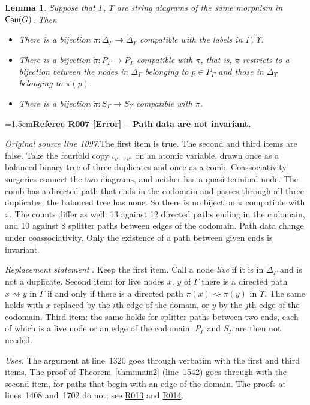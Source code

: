 \documentclass[12pt]{amsart}
\newcommand{\RefereeRemark}[4]{%
  \par\medskip\begingroup\normalfont\small\color{RefereePurple}%
  \emergencystretch=1.5em\noindent\textbf{Referee R#1 [#2] -- #3.}\par\nobreak\noindent #4\par
  \endgroup\medskip
}
\theoremstyle{plain}
\newtheorem{lem}[thm]{Lemma}
\theoremstyle{definition}
\theoremstyle{remark}
\numberwithin{equation}{section}
\theoremstyle{plain}
\newcommand{\0}{\emptyset}
\newcommand{\fun}{\longrightarrow}
\DeclareMathOperator{\cau}{\sf{Cau}}
\begin{document}
\begin{lem}\label{decor:mat}
Suppose that  $\Gamma$, $\Upsilon$ are string diagrams of the same morphism in $\cau(G)$. Then
\begin{itemize}
  \item There is a bijection $\pi : \tilde \Delta_\Gamma \fun \tilde \Delta_{\Upsilon}$ compatible with the labels in $\Gamma$, $\Upsilon$.
  \item There is a bijection $\dot \pi :  P_\Gamma \fun P_{\Upsilon}$  compatible with $\pi$, that is, $\pi$ restricts to a bijection between the nodes in $\tilde \Delta_\Gamma$ belonging to $p \in P_\Gamma$ and those in $\tilde \Delta_\Upsilon$ belonging to $\dot \pi(p)$.
  \item There is a bijection $\ddot \pi : S_\Gamma \fun S_{\Upsilon}$ compatible with $\pi$.
\end{itemize}
\end{lem}
\hypertarget{review-007}{}\RefereeRemark{007}{Error}{Path data are not invariant}{%
\textit{Original source line 1097.}\quad The first item is true. The second and third items are false. Take the fourfold copy $\iota_{v \rightarrow v^4}$ on an atomic variable, drawn once as a balanced binary tree of three duplicates and once as a comb. Coassociativity surgeries connect the two diagrams, and neither has a quasi-terminal node. The comb has a directed path that ends in the codomain and passes through all three duplicates; the balanced tree has none. So there is no bijection $\dot\pi$ compatible with $\pi$. The counts differ as well: 13 against 12 directed paths ending in the codomain, and 10 against 8 splitter paths between edges of the codomain. Path data change under coassociativity. Only the existence of a path between given ends is invariant.
\par\smallskip\emph{Replacement statement} \cite[Lemma~4.3]{YinZhangModularity}. Keep the first item. Call a node \emph{live} if it is in $\tilde \Delta_\Gamma$ and is not a duplicate. Second item: for live nodes $x$, $y$ of $\Gamma$ there is a directed path $x \rightsquigarrow y$ in $\Gamma$ if and only if there is a directed path $\pi(x) \rightsquigarrow \pi(y)$ in $\Upsilon$. The same holds with $x$ replaced by the $i$th edge of the domain, or $y$ by the $j$th edge of the codomain. Third item: the same holds for splitter paths between two ends, each of which is a live node or an edge of the codomain. $P_\Gamma$ and $S_\Gamma$ are then not needed.
\par\smallskip\emph{Uses.} The argument at line~1320 goes through verbatim with the first and third items. The proof of Theorem~\ref{thm:main2} (line~1542) goes through with the second item, for paths that begin with an edge of the domain. The proofs at lines~1408 and~1702 do not; see \hyperlink{review-013}{R013} and \hyperlink{review-014}{R014}.
}
\end{document}

